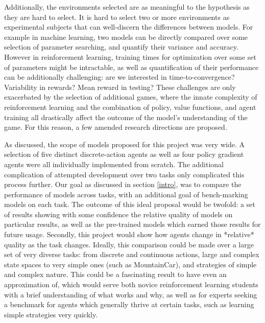 \documentclass[conference]{IEEEtran}
\begin{document}
Additionally, the environments selected are as meaningful to the hypothesis as they are hard to select. It is hard to select two or more environments as experimental subjects that can well-discern the differences between models. For example in machine learning, two models can be directly compared over some selection of parameter searching, and quantify their variance and accuracy. However in reinforcement learning, training times for optimization over some set of parameters might be intractable, as well as quantification of their performance can be additionally challenging: are we interested in time-to-convergence? Variability in rewards? Mean reward in testing? These challenges are only exacerbated by the selection of additional games, where the innate complexity of reinforcement learning and the combination of policy, value functions, and agent training all drastically affect the outcome of the model's understanding of the game. For this reason, a few amended research directions are proposed.

As discussed, the scope of models proposed for this project was very wide. A selection of five distinct discrete-action agents as well as four policy gradient agents were all individually implemented from scratch. The additional complication of attempted development over two tasks only complicated this process further. Our goal as discussed in section \ref{intro}, was to compare the performance of models across tasks, with an additional goal of bench-marking models on each task. The outcome of this ideal proposal would be twofold: a set of results showing with some confidence the relative quality of models on particular results, as well as the pre-trained models which earned those results for future usage. Secondly, this project would show how agents change in *relative* quality as the task changes. Ideally, this comparison could be made over a large set of very diverse tasks: from discrete and continuous actions, large and complex state spaces to very simple ones (such as MountainCar), and strategies of simple and complex nature. This could be a fascinating result to have even an approximation of, which would serve both novice reinforcement learning students with a brief understanding of what works and why, as well as for experts seeking a benchmark for agents which generally thrive at certain tasks, such as learning simple strategies very quickly.

{}


\vspace{12pt}
\end{document}
